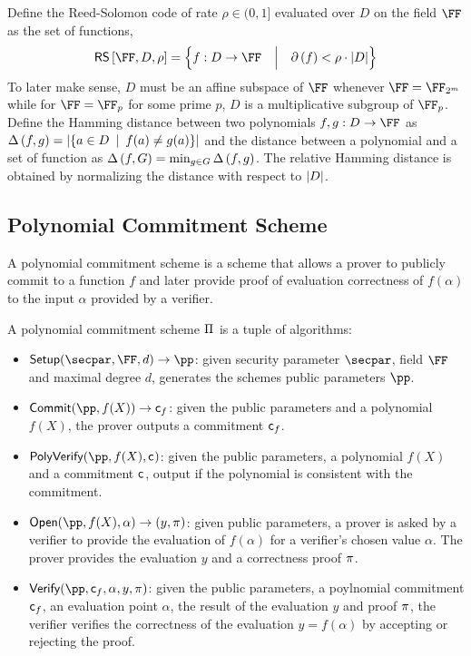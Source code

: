 \documentclass[a4paper,10pt]{article}
\begin{document}
		Define the Reed-Solomon code of rate $\rho \in (0,1] $ evaluated over $D$ on the field $\FF$ as
		the set of functions,
		\[ \rs{\FF}{D}{\rho} = \left\{ \vphantom{\sum}f : D \to \FF \quad \middle\lvert \quad
			\polydeg{f} < \rho \cdot \card{D} \right\} \]
		To later make sense, $D$ must be an affine subspace of $\FF$ whenever $\FF = \FF_{2^m}$ while for
		$\FF = \FF_p$ for some prime $p$, $D$ is a multiplicative subgroup of $\FF_p$.
		Define the Hamming distance between two polynomials $f,g: D \to \FF$ as
		$\Delta\left({f},{g}\right) = \left\lvert  \{ a \in D \:\mid\: f(a) \neq g(a) \} \right\rvert$ and the distance between
		a polynomial and a set of function as $\Delta\left({f},{G}\right) = \min_{g \in G} \Delta\left({f},{g}\right)$.
		The relative Hamming distance is obtained by normalizing the distance with respect to $\left\lvert D \right\rvert$.
		
		
		\subsection{Polynomial Commitment Scheme}
		
		A polynomial commitment scheme is a scheme that allows a prover to publicly commit to a function
		$f$ and later provide proof of evaluation correctness of $f(\alpha)$ to the input $\alpha$
		provided by a verifier.
		
		\begin{definition}\label{def:polycom}
			A polynomial commitment scheme $\Pi_{}$ is a tuple of algorithms:
			\begin{itemize}
				\item $\setup(\secpar,\FF,d) \to \pp$: given security parameter $\secpar$, field $\FF$ and 
					maximal degree $d$, generates the schemes public parameters $\pp$.
				\item $\pcommit(\pp,f(X)) \to \comm{f}$: given the public parameters and a polynomial $f(X)$,
					the prover outputs a commitment $\textsf{c}_{f}$.
				\item $\ppolyverify(\pp,f(X), \comm{})$: given the public parameters, a polynomial $f(X)$
					and a commitment $\textsf{c}_{}$, output if the polynomial is consistent with the commitment.
				\item $\popen(\pp,f(X), \alpha) \to (y, \proo{})$: given public parameters,
					a prover is asked by a verifier to provide the evaluation of $f(\alpha)$ for a verifier's
					chosen value $\alpha$.
					The prover provides the evaluation $y$ and a correctness proof $\pi_{}$.
				\item $\pverify(\pp,\comm{f},\alpha,y,\proo{})$: given the public parameters, a poylnomial
					commitment $\textsf{c}_{f}$, an evaluation point $\alpha$, the result of the evaluation $y$ and
					proof $\pi_{}$, the verifier verifies the correctness of the evaluation $y = f(\alpha)$
					by accepting or rejecting the proof.
			\end{itemize}
		\end{definition}
		
\end{document}
